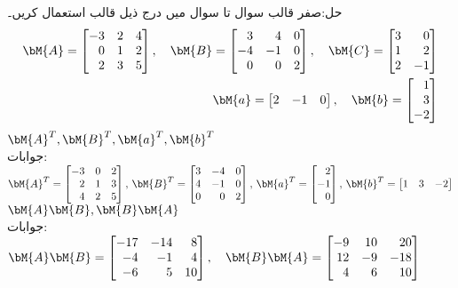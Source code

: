 حل:صفر قالب
سوال  تا سوال  میں درج ذیل قالب استعمال کریں۔
\begin{align*}
\bM{A}=\begin{bmatrix*}[r]-3&2&4\\ 0&1&2\\2&3&5  \end{bmatrix*}, \quad \bM{B}=\begin{bmatrix*}[r] 3&4&0\\ -4&-1&0\\0&0&2 \end{bmatrix*}, \quad \bM{C}=\begin{bmatrix*}[r] 3&0\\1&2\\2&-1 \end{bmatrix*}\\
\bM{a}=\begin{bmatrix*}[r] 2&-1&0 \end{bmatrix*}, \quad \bM{b}=\begin{bmatrix*}[r] 1\\3\\-2 \end{bmatrix*}
\end{align*}
\quad
$\bM{A}^T, \bM{B}^T,\bM{a}^T, \bM{b}^T $\\
جوابات:
$\bM{A}^T=\begin{bmatrix*}[r] -3&0&2\\2&1&3\\4&2&5 \end{bmatrix*},\, \bM{B}^T=\begin{bmatrix*}[r] 3&-4&0\\4&-1&0\\0&0&2 \end{bmatrix*},\, \bM{a}^T=\begin{bmatrix*}[r] 2\\-1\\0 \end{bmatrix*},\, \bM{b}^T=\begin{bmatrix*}[r] 1&3&-2 \end{bmatrix*}$
\quad
$\bM{A}\bM{B}, \bM{B}\bM{A}$\\
جوابات:
$\bM{A}\bM{B}=\begin{bmatrix*}[r] -17&-14&8\\-4&-1&4\\-6&5&10 \end{bmatrix*},\quad \bM{B}\bM{A}=\begin{bmatrix*}[r] -9&10&20\\12&-9&-18\\4&6&10\end{bmatrix*}$
